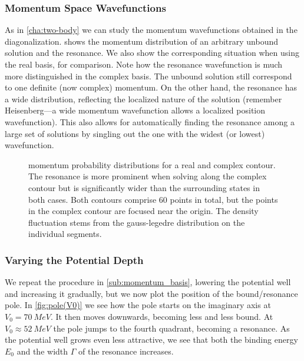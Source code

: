 \documentclass[../main/report.tex]{subfiles}
\begin{document}
\subsubsection{Momentum Space Wavefunctions}

As in \cref{cha:two-body} we can study the momentum wavefunctions obtained in the diagonalization.
 shows the momentum distribution of an arbitrary unbound solution and the resonance. We also show the corresponding situation when using the real basis, for comparison. Note how the resonance wavefunction is much more distinguished in the complex basis.  
The unbound solution still correspond to one definite (now complex) momentum. 
On the other hand, the resonance has a wide distribution, reflecting the localized nature of the solution 
(remember Heisenberg---a wide momentum wavefunction allows a localized position wavefunction). 
This also allows for automatically finding the resonance among a large set of solutions by singling out the one with the widest (or lowest) wavefunction.


\begin{figure}
\caption{ momentum probability distributions for a real and complex contour. The resonance is more prominent when solving along the complex contour but is significantly wider than the surrounding states in both cases. Both contours comprise 60 points in total, but the points in the complex contour are focused near the origin. The density fluctuation stems from the gauss-legedre distribution on the individual segments.} 
\label{fig:complex_mom_wavefunctions}
\end{figure}



\subsubsection{Varying the Potential Depth}

We repeat the procedure in \cref{sub:momentum_basis}, lowering the potential well and increasing it gradually, but we now plot the position of the bound/resonance pole.
In \cref{fig:pole(V0)} we see how the pole starts on the imaginary axis at $V_0 = \SI{70}{MeV}$. It then moves downwards, becoming less and less bound.
At $V_0 \approx \SI{52}{MeV}$ the pole jumps to the fourth quadrant, becoming a resonance.
As the potential well grows even less attractive, we see that both the binding energy $E_0$ and the width $\Gamma$ of the resonance increases.
\end{document}

